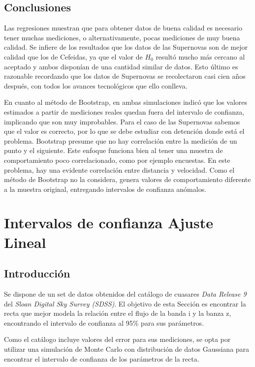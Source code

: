 \documentclass{article}
\begin{document}
\subsection{Conclusiones}

Las regresiones muestran que para obtener datos de buena calidad es necesario tener muchas mediciones, o alternativamente, pocas mediciones de muy buena calidad. Se infiere de los resultados que los datos de las Supernovas son de mejor calidad que los de Cefeidas, ya que el valor de $H_0$ resultó mucho más cercano al aceptado y ambos disponían de una cantidad similar de datos. Esto último es razonable recordando que los datos de Supernovas se recolectaron casi cien años después, con todos los avances tecnológicos que ello conlleva.

En cuanto al método de Bootstrap, en ambas simulaciones indicó que los valores estimados a partir de mediciones reales quedan fuera del intervalo de confianza, implicando que son muy improbables. Para el caso de las Supernovas sabemos que el valor es correcto, por lo que se debe estudiar con detención donde está el problema. Bootstrap presume que no hay correlación entre la medición de un punto y el siguiente. Este enfoque funciona bien al tener una muestra de comportamiento poco correlacionado, como por ejemplo encuestas. En este problema, hay una evidente correlación entre distancia y velocidad. Como el método de Bootstrap no la considera, genera valores de comportamiento diferente a la muestra original, entregando intervalos de confianza anómalos.

\clearpage
\section{Intervalos de confianza Ajuste Lineal}

\subsection{Introducción}

Se dispone de un set de datos obtenidos del catálogo de cuasares \emph{Data Release 9} del \emph{Sloan Digital Sky Survey (SDSS)}. El objetivo de esta Sección es encontrar la recta que mejor modela la relación entre el flujo de la banda i y la banza z, encontrando el intervalo de confianza al 95\% para sus parámetros. 

Como el catálogo incluye valores del error para sus mediciones, se opta por utilizar una simulación de Monte Carlo con distribución de datos Gaussiana para encontrar el intervalo de confianza de los parámetros de la recta.
\end{document}

